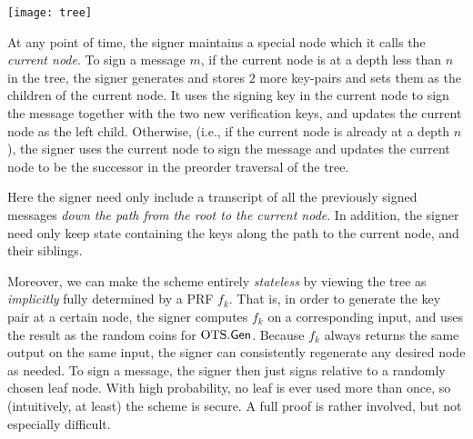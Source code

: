 \documentclass[11pt]{article}
\begin{document}
\begin{center}
\texttt{[image: tree]}
\end{center}

At any point of time, the signer maintains a special node which it
calls the \emph{current node}.  To sign a message $m$, if the current
node is at a depth less than $n$ in the tree, the signer generates and
stores $2$ more key-pairs and sets them as the children of the current
node.  It uses the signing key in the current node to sign the message
together with the two new verification keys, and updates the current
node as the left child.  Otherwise, (i.e., if the current node is
already at a depth $n$), the signer uses the current node to sign the
message and updates the current node to be the successor in the
preorder traversal of the tree.

Here the signer need only include a transcript of all the previously
signed messages \emph{down the path from the root to the current
  node}.  In addition, the signer need only keep state containing the
keys along the path to the current node, and their siblings.

Moreover, we can make the scheme entirely \emph{stateless} by viewing
the tree as \emph{implicitly} fully determined by a PRF $f_{k}$.  That
is, in order to generate the key pair at a certain node, the signer
computes $f_{k}$ on a corresponding input, and uses the result as the
random coins for $\text{OTS}.\mathsf{Gen}$.  Because $f_{k}$ always returns the
same output on the same input, the signer can consistently regenerate
any desired node as needed.  To sign a message, the signer then just
signs relative to a randomly chosen leaf node.  With high probability,
no leaf is ever used more than once, so (intuitively, at least) the
scheme is secure.  A full proof is rather involved, but not especially
difficult.
\end{document}
